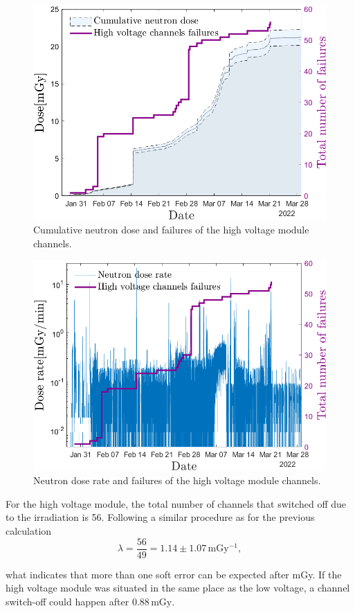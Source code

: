 \begin{figure}[!h]
    \centering
    \includegraphics[width=0.6\columnwidth]{Chapter4/images/HV_failure_and_neutronsrate.png}
    \caption{Cumulative neutron dose and failures of the high voltage module channels.}
    \label{fig:hv_neutrons}
\end{figure}
\begin{figure}[!h]
    \centering
    \includegraphics[width=0.6\columnwidth]{Chapter4/images/Hv_neutrons_dose_rate.png}
    \caption{Neutron dose rate and failures of the high voltage module channels.}
    \label{fig:hv_neutrons_rate}
\end{figure}

For the high voltage module, the total number of channels that switched off due to the irradiation is 56. Following a similar procedure as for the previous calculation
  \begin{equation}
 \lambda = \frac{56}{49} = 1.14\pm 1.07\,\mathrm{mGy^{-1}},
\end{equation}

what indicates that more than one soft error can be expected after mGy. 
If the high voltage module was situated in the same place as the low voltage, a channel switch-off could happen after $0.88\mathrm{\,mGy}$. 



